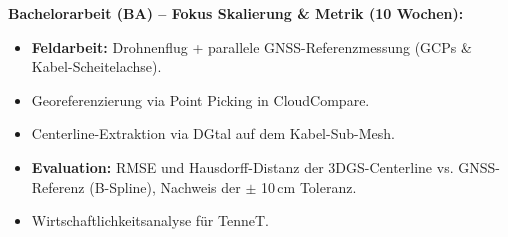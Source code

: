 \documentclass[12pt,a4paper]{article}
\begin{document}
\noindent\textbf{Bachelorarbeit (BA) -- Fokus Skalierung \& Metrik (10 Wochen):}
\begin{itemize}[noitemsep]
    \item \textbf{Feldarbeit:} Drohnenflug + parallele GNSS-Referenzmessung (GCPs \& Kabel-Scheitelachse).
    \item Georeferenzierung via Point Picking in CloudCompare.
    \item Centerline-Extraktion via DGtal auf dem Kabel-Sub-Mesh.
    \item \textbf{Evaluation:} RMSE und Hausdorff-Distanz der 3DGS-Centerline vs. GNSS-Referenz (B-Spline), Nachweis der $\pm$ 10\,cm Toleranz.
    \item Wirtschaftlichkeitsanalyse für TenneT.
\end{itemize}
\end{document}
